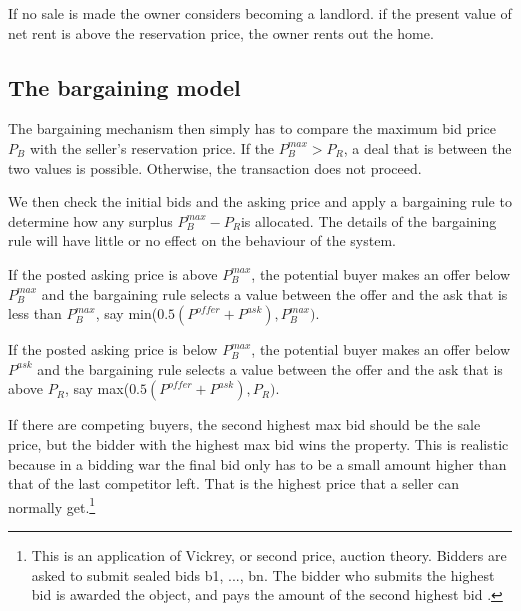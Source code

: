 If no sale is made the owner considers becoming a landlord. if the present value of net rent is above the reservation price, the owner rents out the home. 


\subsection{The bargaining model} \label{section-bargaining}
The bargaining  mechanism then simply has to compare the maximum bid price  $P_B$ with the seller's reservation price. If the $P_B^{max}>P_R$, a deal that is between the two values is possible. Otherwise, the transaction does not proceed.

We then check the initial bids and the asking price and apply a bargaining rule to determine how any surplus $P_B^{max}-P_R$is allocated. The details of the bargaining rule will have little or no effect on the  behaviour of the system. 

If the posted asking price is above $P_B^{max}$, the potential buyer  makes an offer below $P_B^{max}$ and the bargaining rule selects a value between the offer and the ask that is less than $P_B^{max}$, say min($0.5(P^{offer}+P^{ask}), P_B^{max})$.

If the posted asking price is below $P_B^{max}$, the potential buyer  makes an offer below $P^{ask}$ and the bargaining rule selects a value between the offer and the ask that is above $P_R$, say max($0.5(P^{offer}+P^{ask}), P_R)$. 

If there  are competing buyers, the second highest max bid should be the sale price, but the bidder with the highest max bid wins the property. This is realistic because in a bidding war the final bid only has to be a small amount higher than that of the last competitor left.  That is the highest price that a seller can normally get.\footnote{This is an application of Vickrey, or second price, auction theory. Bidders are asked to submit sealed bids b1, ..., bn. The bidder who submits the highest bid is awarded the object, and pays the amount of the second highest bid \cite{levinAuctionTheory2004}.}

 







